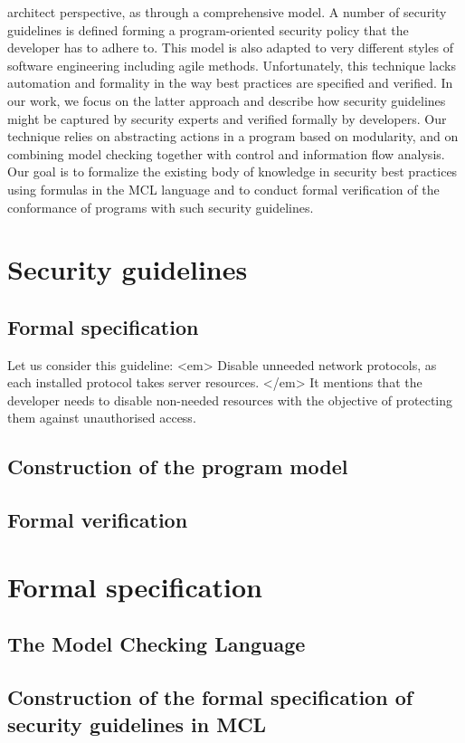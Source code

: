 \documentclass[10pt]{article}
\begin{document}
architect perspective, as through a comprehensive model. A number of security guidelines is
defined forming a program-oriented security policy that the developer has to adhere to. This
model is also adapted to very different styles of software engineering including agile methods.
Unfortunately, this technique lacks automation and formality in the way best practices are
specified and verified.
In our work, we focus on the latter approach and describe how security guidelines might
be captured by security experts and verified formally by developers. Our technique relies
on abstracting actions in a program based on modularity, and on combining model checking
together with control and information flow analysis. Our goal is to formalize the existing
body of knowledge in security best practices using formulas in the MCL language and to
conduct formal verification of the conformance of programs with such security guidelines.
\section{Security guidelines}
\subsection {Formal specification}
Let us consider this guideline:
<em> Disable unneeded network protocols, as each installed protocol takes server
resources. </em>
It mentions that the developer needs to disable non-needed resources with the objective of protecting them against unauthorised access.

\subsection {Construction of the program model}
\subsection {Formal verification}
\section{Formal specification}
\subsection {The Model Checking Language}
\subsection {Construction of the formal specification of security guidelines in MCL}
\end{document}
